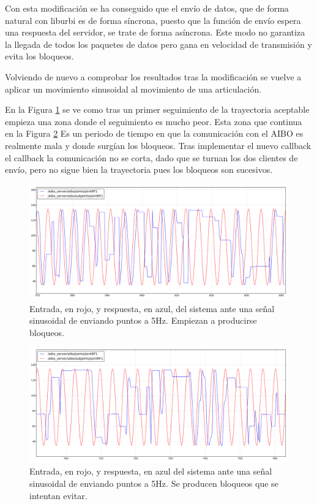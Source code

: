 \documentclass[12pt,a4paper,final,twoside]{book}
\begin{document}
Con esta modificación se ha conseguido que el envío de datos, que de forma natural con liburbi es de forma síncrona, puesto que la función de envío espera una respuesta del servidor, se trate de forma asíncrona. Este modo no garantiza la llegada de todos los paquetes de datos pero gana en velocidad de transmisión y evita los bloqueos.

Volviendo de nuevo a comprobar los resultados tras la modificación se vuelve a aplicar un movimiento sinusoidal al movimiento de una articulación.

En la Figura \ref{fig:ASempiezamala} se ve como tras un primer seguimiento de la trayectoria aceptable empieza una zona donde el seguimiento es mucho peor. Esta zona que continua en la Figura \ref{fig:ASpeor} Es un periodo de tiempo en que la comunicación con el AIBO es realmente mala y donde surgían los bloqueos. Tras implementar el nuevo callback el callback la comunicación no se corta, dado que se turnan los dos clientes de envío, pero no sigue bien la trayectoria pues los bloqueos son sucesivos.

\begin{figure}[H]
	\centering
    \includegraphics[scale=0.375]{images/sinlegWR/mejorado/empiezamala.png}
 	\caption{Entrada, en rojo, y respuesta, en azul, del sistema ante una señal sinusoidal de enviando puntos a 5Hz. Empiezan a producirse bloqueos.}
  \label{fig:ASempiezamala}
\end{figure}
\begin{figure}[H]
	\centering
    \includegraphics[scale=0.375]{images/sinlegWR/mejorado/peora5hz.png}
 	\caption{Entrada, en rojo, y respuesta, en azul del sistema ante una señal sinusoidal de enviando puntos a 5Hz. Se producen bloqueos que se intentan evitar.}
  \label{fig:ASpeor}
\end{figure}
\end{document}
